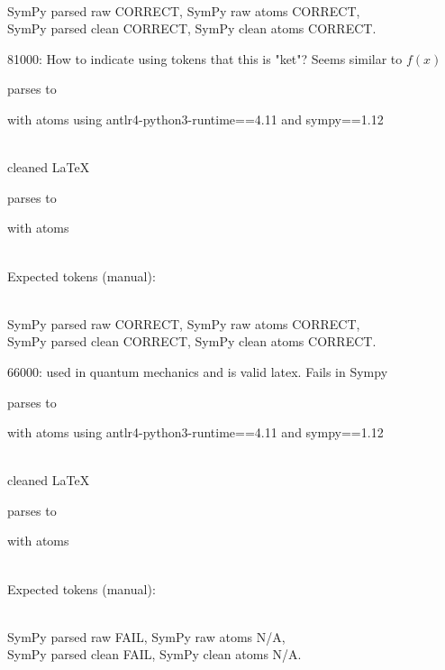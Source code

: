 \documentclass{article}
\begin{document}
\ \\
SymPy parsed raw CORRECT, 
SymPy raw atoms CORRECT, \\
SymPy parsed clean CORRECT, 
SymPy clean atoms CORRECT.

\hrulefill

81000:
How to indicate using tokens that this is "ket"? Seems similar to $f(x)$

parses to

with atoms
using antlr4-python3-runtime==4.11 and sympy==1.12

\ \\
cleaned \LaTeX

parses to

with atoms


\ \\
Expected tokens (manual):




\ \\
SymPy parsed raw CORRECT, 
SymPy raw atoms CORRECT, \\
SymPy parsed clean CORRECT, 
SymPy clean atoms CORRECT.

\hrulefill


66000: 
used in quantum mechanics and is valid latex. Fails in Sympy

parses to

with atoms
using antlr4-python3-runtime==4.11 and sympy==1.12

\ \\
cleaned \LaTeX

parses to

with atoms


\ \\
Expected tokens (manual):



\ \\
SymPy parsed raw FAIL, 
SymPy raw atoms N/A, \\
SymPy parsed clean FAIL, 
SymPy clean atoms N/A.
\end{document}
